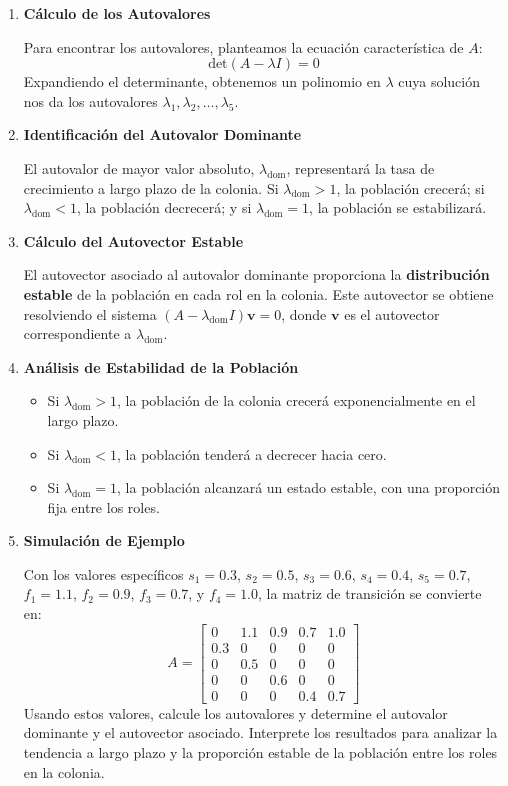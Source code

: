 \documentclass{article}
\begin{document}
\begin{enumerate}
    \item \textbf{Cálculo de los Autovalores}

    Para encontrar los autovalores, planteamos la ecuación característica de \( A \):
    \[
    \text{det}(A - \lambda I) = 0
    \]
    Expandiendo el determinante, obtenemos un polinomio en \(\lambda\) cuya solución nos da los autovalores \(\lambda_1, \lambda_2, \dots, \lambda_5\).

    \item \textbf{Identificación del Autovalor Dominante}

    El autovalor de mayor valor absoluto, \(\lambda_{\text{dom}}\), representará la tasa de crecimiento a largo plazo de la colonia. Si \(\lambda_{\text{dom}} > 1\), la población crecerá; si \(\lambda_{\text{dom}} < 1\), la población decrecerá; y si \(\lambda_{\text{dom}} = 1\), la población se estabilizará.

    \item \textbf{Cálculo del Autovector Estable}

    El autovector asociado al autovalor dominante proporciona la \textbf{distribución estable} de la población en cada rol en la colonia. Este autovector se obtiene resolviendo el sistema \((A - \lambda_{\text{dom}} I) \mathbf{v} = 0\), donde \(\mathbf{v}\) es el autovector correspondiente a \(\lambda_{\text{dom}}\).

    \item \textbf{Análisis de Estabilidad de la Población}

    \begin{itemize}
        \item Si \(\lambda_{\text{dom}} > 1\), la población de la colonia crecerá exponencialmente en el largo plazo.
        \item Si \(\lambda_{\text{dom}} < 1\), la población tenderá a decrecer hacia cero.
        \item Si \(\lambda_{\text{dom}} = 1\), la población alcanzará un estado estable, con una proporción fija entre los roles.
    \end{itemize}

    \item \textbf{Simulación de Ejemplo}

    Con los valores específicos \( s_1 = 0.3 \), \( s_2 = 0.5 \), \( s_3 = 0.6 \), \( s_4 = 0.4 \), \( s_5 = 0.7 \), \( f_1 = 1.1 \), \( f_2 = 0.9 \), \( f_3 = 0.7 \), y \( f_4 = 1.0 \), la matriz de transición se convierte en:
    \[
    A = \begin{bmatrix} 0 & 1.1 & 0.9 & 0.7 & 1.0 \\ 0.3 & 0 & 0 & 0 & 0 \\ 0 & 0.5 & 0 & 0 & 0 \\ 0 & 0 & 0.6 & 0 & 0 \\ 0 & 0 & 0 & 0.4 & 0.7 \end{bmatrix}
    \]
    Usando estos valores, calcule los autovalores y determine el autovalor dominante y el autovector asociado. Interprete los resultados para analizar la tendencia a largo plazo y la proporción estable de la población entre los roles en la colonia.
\end{enumerate}
\end{document}

